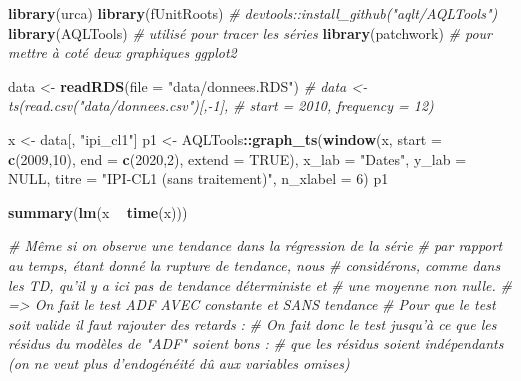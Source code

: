 \documentclass[french]{article}
\newenvironment{Shaded}{\begin{snugshade}}{\end{snugshade}}
\newcommand{\CommentTok}[1]{\textcolor[rgb]{0.56,0.35,0.01}{\textit{#1}}}
\newcommand{\DataTypeTok}[1]{\textcolor[rgb]{0.13,0.29,0.53}{#1}}
\newcommand{\DecValTok}[1]{\textcolor[rgb]{0.00,0.00,0.81}{#1}}
\newcommand{\KeywordTok}[1]{\textcolor[rgb]{0.13,0.29,0.53}{\textbf{#1}}}
\newcommand{\NormalTok}[1]{#1}
\newcommand{\OperatorTok}[1]{\textcolor[rgb]{0.81,0.36,0.00}{\textbf{#1}}}
\newcommand{\OtherTok}[1]{\textcolor[rgb]{0.56,0.35,0.01}{#1}}
\newcommand{\StringTok}[1]{\textcolor[rgb]{0.31,0.60,0.02}{#1}}
\begin{document}
\begin{Shaded}
\begin{Highlighting}[]
\KeywordTok{library}\NormalTok{(urca)}
\KeywordTok{library}\NormalTok{(fUnitRoots)}
\CommentTok{# devtools::install_github("aqlt/AQLTools")}
\KeywordTok{library}\NormalTok{(AQLTools) }\CommentTok{# utilisé pour tracer les séries}
\KeywordTok{library}\NormalTok{(patchwork) }\CommentTok{# pour mettre à coté deux graphiques ggplot2}

\NormalTok{data <-}\StringTok{ }\KeywordTok{readRDS}\NormalTok{(}\DataTypeTok{file =} \StringTok{"data/donnees.RDS"}\NormalTok{)}
\CommentTok{# data <- ts(read.csv("data/donnees.csv")[,-1],}
\CommentTok{#          start = 2010, frequency = 12)}


\NormalTok{x <-}\StringTok{ }\NormalTok{data[, }\StringTok{"ipi_cl1"}\NormalTok{]}
\NormalTok{p1 <-}\StringTok{ }\NormalTok{AQLTools}\OperatorTok{::}\KeywordTok{graph_ts}\NormalTok{(}\KeywordTok{window}\NormalTok{(x,}
                                \DataTypeTok{start =} \KeywordTok{c}\NormalTok{(}\DecValTok{2009}\NormalTok{,}\DecValTok{10}\NormalTok{),}
                                \DataTypeTok{end =} \KeywordTok{c}\NormalTok{(}\DecValTok{2020}\NormalTok{,}\DecValTok{2}\NormalTok{),}
                                \DataTypeTok{extend =} \OtherTok{TRUE}\NormalTok{), }\DataTypeTok{x_lab =} \StringTok{"Dates"}\NormalTok{, }\DataTypeTok{y_lab =} \OtherTok{NULL}\NormalTok{,}
                         \DataTypeTok{titre =} \StringTok{"IPI-CL1 (sans traitement)"}\NormalTok{, }\DataTypeTok{n_xlabel =} \DecValTok{6}\NormalTok{)}
\NormalTok{p1}

\KeywordTok{summary}\NormalTok{(}\KeywordTok{lm}\NormalTok{(x }\OperatorTok{~}\StringTok{ }\KeywordTok{time}\NormalTok{(x)))}

\CommentTok{# Même si on observe une tendance dans la régression de la série}
\CommentTok{# par rapport au temps, étant donné la rupture de tendance, nous }
\CommentTok{# considérons, comme dans les TD, qu'il y a ici pas de tendance déterministe et}
\CommentTok{# une moyenne non nulle. }
\CommentTok{# => On fait le test ADF AVEC constante et SANS tendance}
\CommentTok{# Pour que le test soit valide il faut rajouter des retards :}
\CommentTok{# On fait donc le test jusqu'à ce que les résidus du modèles de "ADF" soient bons :}
\CommentTok{# que les résidus soient indépendants (on ne veut plus d'endogénéité dû aux variables omises)}


\end{Highlighting}
\end{Shaded}
\end{document}
